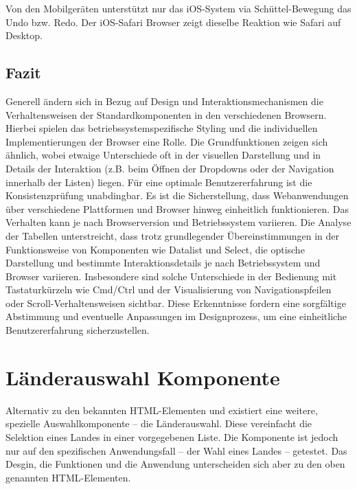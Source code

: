 Von den Mobilgeräten unterstützt nur das iOS-System via Schüttel-Bewegung das Undo bzw. Redo.
Der iOS-Safari Browser zeigt dieselbe Reaktion wie Safari auf Desktop.


\clearpage
\subsection{Fazit}
\label{sec:summeryExisting}

Generell ändern sich in Bezug auf Design und Interaktionsmechanismen die Verhaltensweisen der Standardkomponenten in den verschiedenen Browsern. 
Hierbei spielen das betriebssystemspezifische Styling und die individuellen Implementierungen der Browser eine Rolle. 
Die Grundfunktionen zeigen sich ähnlich, wobei etwaige Unterschiede oft in der visuellen Darstellung und in Details der Interaktion (z.B. beim Öffnen der Dropdowns oder der Navigation innerhalb der Listen) liegen. 
Für eine optimale Benutzererfahrung ist die Konsistenzprüfung unabdingbar.
Es ist die Sicherstellung, dass Webanwendungen über verschiedene Plattformen und Browser hinweg einheitlich funktionieren. 
Das Verhalten kann je nach Browserversion und Betriebssystem variieren. 
Die Analyse der Tabellen unterstreicht, dass trotz grundlegender Übereinstimmungen in der Funktionsweise von Komponenten wie Datalist und Select, 
die optische Darstellung und bestimmte Interaktionsdetails je nach Betriebssystem und Browser variieren. 
Insbesondere sind solche Unterschiede in der Bedienung mit Tastaturkürzeln wie Cmd/Ctrl und der Visualisierung von Navigationspfeilen oder Scroll-Verhaltensweisen sichtbar. 
Diese Erkenntnisse fordern eine sorgfältige Abstimmung und eventuelle Anpassungen im Designprozess, um eine einheitliche Benutzererfahrung sicherzustellen.


\section{Länderauswahl Komponente}
\label{sec:countryChoice}

Alternativ zu den bekannten HTML-Elementen  und  existiert eine weitere, spezielle Auswahlkomponente – die Länderauswahl\citemarktext{
    [\cite{ip5}]
}.
Diese vereinfacht die Selektion eines Landes in einer vorgegebenen Liste. 
Die Komponente ist jedoch nur auf den spezifischen Anwendungsfall – der Wahl eines Landes – getestet.
Das Desgin, die Funktionen und die Anwendung unterscheiden sich aber zu den oben genannten HTML-Elementen.

